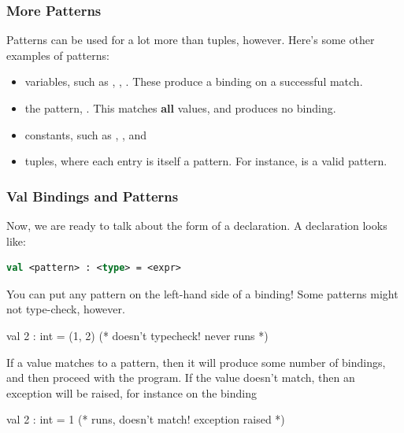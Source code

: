 \documentclass[aspectratio=169]{beamer}
\begin{document}
\begin{frame}[fragile]
  \frametitle{More Patterns}

  Patterns can be used for a lot more than tuples, however. Here's some other examples of patterns:

  \pause
  \vspace{\fill}

  \begin{itemize}
    \item variables, such as , , . These produce a binding on a successful match.
    \item the  pattern, \code{_}. This matches \textbf{all} values, and
    produces no binding.
    \item constants, such as , , and 
    \item tuples, where each entry is itself a pattern. For instance,  is
    a valid pattern.
  \end{itemize}
\end{frame}

\begin{frame}[fragile]
  \frametitle{Val Bindings and Patterns}

  Now, we are ready to talk about the form of a  declaration. A  declaration looks like:

  \vspace{\fill}

  \begin{lstlisting}[style=15150code, numbers=none, language=sml]
    val <pattern> : <type> = <expr>
  \end{lstlisting}

  \pause
  \vspace{\fill}

  You can put any pattern on the left-hand side of a binding! Some patterns might not type-check,
  however.
  \begin{codeblock}
    val 2 : int = (1, 2) (* doesn't typecheck! never runs *)
  \end{codeblock}

  \pause
  \vspace{\fill}

  If a value matches to a pattern, then it will produce some number of bindings, and then proceed
  with the program. If the value doesn't match, then an exception will be raised, for instance
  on the binding
  \begin{codeblock}
    val 2 : int = 1 (* runs, doesn't match! exception raised *)
  \end{codeblock}
\end{frame}
\end{document}
